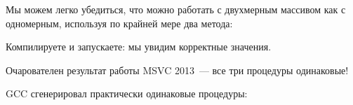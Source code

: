 ﻿

Мы можем легко убедиться, что можно работать с двухмерным массивом как с одномерным,
используя по крайней мере два метода:



Компилируете и запускаете: мы увидим корректные значения.

Очарователен результат работы MSVC 2013~--- все три процедуры одинаковые!



GCC сгенерировал практически одинаковые процедуры:



